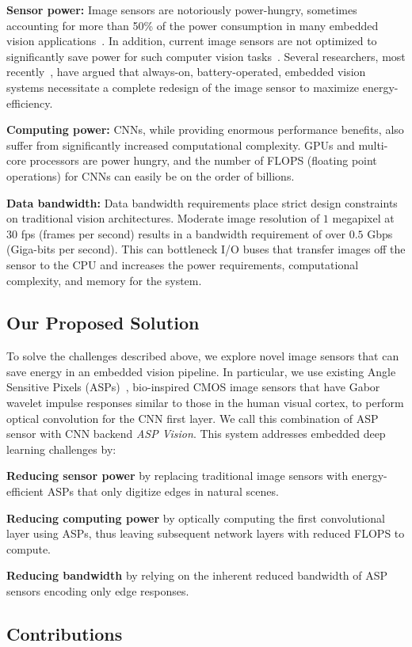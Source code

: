 \documentclass[10pt,twocolumn,letterpaper]{article}
\newcommand{\Subsection}[1]{\vspace{-3pt}\subsection{#1}\vspace{-3pt}}
\newenvironment{tight_itemize}{\begin{itemize}[leftmargin=*] \itemsep
-3pt}{\end{itemize}}
\begin{document}
\begin{tight_itemize}
\item{\textbf{Sensor power:} Image sensors are notoriously power-hungry, sometimes accounting for more than 50\% of the power consumption in many embedded vision applications~\cite{likamwa2013energy}. In addition, current image sensors are not optimized to significantly save power for such computer vision tasks~\cite{likamwa2013energy}. Several researchers, most recently~\cite{likamwaRedEye}, have argued that always-on, battery-operated, embedded vision systems necessitate a complete redesign of the image sensor to maximize energy-efficiency. } 

\item{\textbf{Computing power:} CNNs, while providing enormous performance benefits, also suffer from significantly increased computational complexity. GPUs and multi-core processors are power hungry, and the number of FLOPS (floating point operations) for CNNs can easily be on the order of billions.} %

\item{\textbf{Data bandwidth:} Data bandwidth requirements place strict design constraints on traditional vision architectures. Moderate image resolution of $1$ megapixel at $30$ fps (frames per second) results in a bandwidth requirement of over $0.5$ Gbps (Giga-bits per second). This can bottleneck I/O buses that transfer images off the sensor to the CPU and increases the power requirements, computational complexity, and memory for the system.} 
\end{tight_itemize}\Subsection{Our Proposed Solution}
To solve the challenges described above, we explore novel image sensors that can save energy in an embedded vision pipeline. In particular, we use existing Angle Sensitive Pixels (ASPs)~\cite{wang2012light}, bio-inspired CMOS image sensors that have Gabor wavelet impulse responses similar to those in the human visual cortex, to perform optical convolution for the CNN first layer. We call this combination of ASP sensor with CNN backend \textit{ASP Vision}. This system addresses embedded deep learning challenges by: 
\begin{tight_itemize}
\item{\textbf{Reducing sensor power} by replacing traditional image sensors with energy-efficient ASPs that only digitize edges in natural scenes. } 
\item{\textbf{Reducing computing power} by optically computing the first convolutional layer using ASPs, thus leaving subsequent network layers with reduced FLOPS to compute.} 
\item{\textbf{Reducing bandwidth} by relying on the inherent reduced bandwidth of ASP sensors encoding only edge responses.} 
\end{tight_itemize}\Subsection{Contributions}
\end{document}
